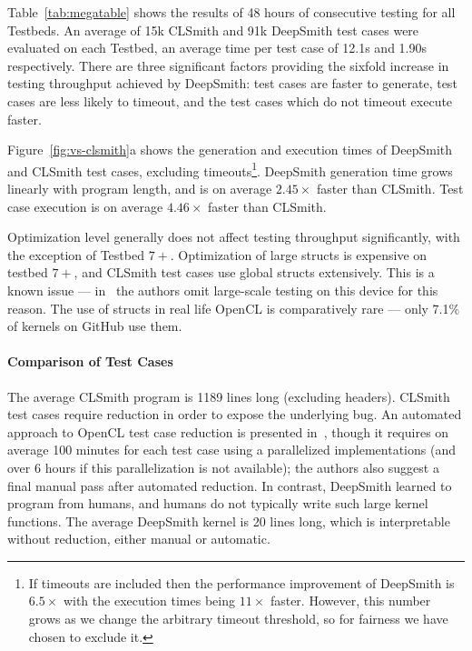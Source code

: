 Table~\ref{tab:megatable} shows the results of 48 hours of consecutive testing for all Testbeds. An average of 15k CLSmith and 91k DeepSmith test cases were evaluated on each Testbed, an average time per test case of 12.1s and 1.90s respectively. There are three significant factors providing the sixfold increase in testing throughput achieved by DeepSmith: test cases are faster to generate, test cases are less likely to timeout, and the test cases which do not timeout execute faster.

Figure~\ref{fig:vs-clsmith}a shows the generation and execution times of DeepSmith and CLSmith test cases, excluding timeouts\footnote{If timeouts are included then the performance improvement of DeepSmith is $6.5\times$ with the execution times being $11\times$ faster. However, this number grows as we change the arbitrary timeout threshold, so for fairness we have chosen to exclude it.}. DeepSmith generation time grows linearly with program length, and is on average $2.45\times$ faster than CLSmith. Test case execution is on average $4.46\times$ faster than CLSmith.

Optimization level generally does not affect testing throughput significantly, with the exception of Testbed $7+$. Optimization of large structs is expensive on testbed $7+$, and CLSmith test cases use global structs extensively. This is a known issue --- in~\cite{Lidbury2015a} the authors omit large-scale testing on this device for this reason. The use of structs in real life OpenCL is comparatively rare --- only 7.1\% of kernels on GitHub use them.



\paragraph{Comparison of Test Cases} %
The average CLSmith program is 1189 lines long (excluding headers). CLSmith test cases require reduction in order to expose the underlying bug. An automated approach to OpenCL test case reduction is presented in~\cite{Pflanzer2016}, though it requires on average 100 minutes for each test case using a parallelized implementations (and over 6 hours if this parallelization is not available); the authors also suggest a final manual pass after automated reduction. In contrast, DeepSmith learned to program from humans, and humans do not typically write such large kernel functions. The average DeepSmith kernel is 20 lines long, which is interpretable without reduction, either manual or automatic. 

